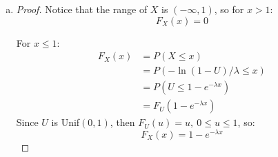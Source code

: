 \documentclass[11pt]{extarticle}
\begin{document}
\begin{enumerate}[(a)]
\item \begin{proof}





	

	



Notice that the range of $X$ is $(-\infty, 1)$, so for $x > 1$: $$ F_X(x) = 0$$

For $x \leq 1$: \begin{equation} 
\begin{split} F_X(x) & =  P(X \leq x) \\ 
& = P( -\ln(1-U)/\lambda \leq x)  \\
& = P(U \leq 1-e^{-\lambda x}) \\
& = F_U(1-e^{-\lambda x}) 
\end{split}
\end{equation}
 Since $U$ is Unif$(0, 1)$, then $ F_U(u) = u,\ 0 \leq u \leq 1 $, so: $$ \boxed{F_X(x)  = 1- e^{-\lambda x}} $$ 


\end{proof}
\end{enumerate}
\end{document}
